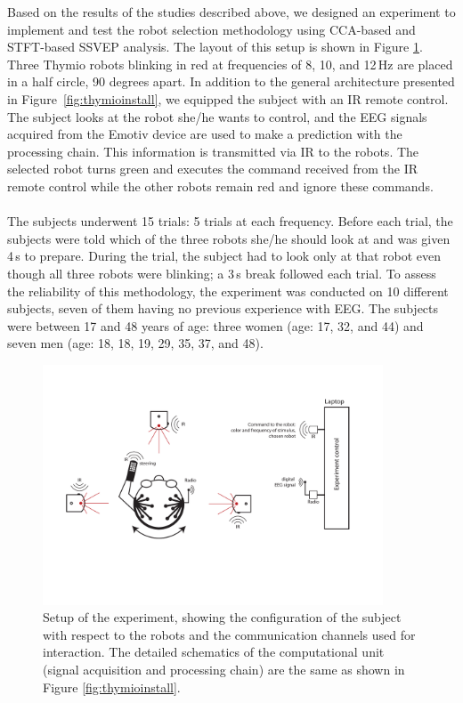 \documentclass[smallextended]{svjour3}
\begin{document}
Based on the results of the studies described above, we designed an experiment to implement and test the robot selection methodology using CCA-based and STFT-based SSVEP analysis. 
The layout of this setup is shown in Figure \ref{fig:experiment-set-up}. 
Three Thymio robots blinking in red at frequencies of 8, 10, and 12\,Hz are placed in a half circle, 90 degrees apart.
In addition to the general architecture presented in Figure~\ref{fig:thymioinstall}, we equipped the subject with an IR remote control.
The subject looks at the robot she/he wants to control, and the EEG signals acquired from the Emotiv device are used to make a prediction with the processing chain.
This information is transmitted via IR to the robots.
The selected robot turns green and executes the command received from the IR remote control while the other robots remain red and ignore these commands.\\
\\
The subjects underwent 15 trials: 5 trials at each frequency. Before each trial, the subjects were told which of the three robots she/he should look at and was given 4\,s to prepare. During the trial, the subject had to look only at that robot even though all three robots were blinking; a 3\,s break followed each trial.
To assess the reliability of this methodology, the experiment was conducted on 10 different subjects, seven of them having no previous experience with EEG.
The subjects were between 17 and 48 years of age: three women (age: 17, 32, and 44) and seven men (age: 18, 18, 19, 29, 35, 37, and 48). 

\begin{figure}
\center
\includegraphics[width=0.9\textwidth]{figures/schema-global2.pdf}
    \caption{Setup of the experiment, showing the configuration of the subject with respect to the robots and the communication channels used for interaction. The detailed schematics of the computational unit (signal acquisition and processing chain) are the same as shown in Figure \ref{fig:thymioinstall}.} \label{fig:experiment-set-up}
\end{figure}
\end{document}
